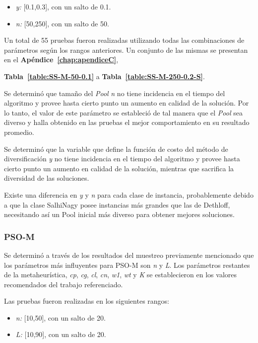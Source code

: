 \begin{itemize}
\item \emph{y:} [0.1,0.3], con un salto de 0.1.
\item \emph{n:} [50,250], con un salto de 50.
\end{itemize}
 

Un total de 55 pruebas fueron realizadas utilizando todas las combinaciones de parámetros según los rangos anteriores. Un conjunto de las mismas se presentan en el \textbf{Apéndice~\ref{chap:apendiceC}}, 

\textbf{Tabla~\ref{table:SS-M-50-0.1}} a \textbf{Tabla~\ref{table:SS-M-250-0.2-S}}.

Se determinó que tamaño del \textit{Pool} \emph{n} no tiene incidencia en el tiempo del algoritmo y provee hasta cierto punto un aumento en calidad de la solución. Por lo tanto, el valor de este parámetro se estableció de tal manera que el \textit{Pool} sea diverso y halla obtenido en las pruebas el mejor comportamiento en su resultado promedio.

Se determinó que la variable que define la función de costo del método de diversificación \emph{y} no tiene incidencia en el tiempo del algoritmo y provee hasta cierto punto un aumento en calidad de la solución, mientras que sacrifica la diversidad de las soluciones. 

Existe una diferencia en \emph{y} y \emph{n} para cada clase de instancia, probablemente debido a que la clase SalhiNagy posee instancias más grandes que las de Dethloff, necesitando así un Pool inicial más diverso para obtener mejores soluciones.\\

\subsubsection*{PSO-M}

Se determinó a través de los resultados del muestreo previamente mencionado que los parámetros más influyentes para PSO-M son \emph{n} y \emph{L}. Los parámetros restantes de la metaheurística, \emph{cp}, \emph{cg}, \emph{cl}, \emph{cn}, \emph{w1}, \emph{wt} y \emph{K} se establecieron en los valores recomendados del trabajo referenciado.

Las pruebas fueron realizadas en los siguientes rangos:

\begin{itemize}
\item \emph{n:} [10,50], con un salto de 20.
\item \emph{L:} [10,90], con un salto de 20.
\end{itemize}

